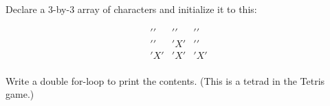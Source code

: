 \begin{ex}
Declare a 3-by-3 array of characters and initialize it to this:

\begin{align*}
' ' & ' ' & ' ' \\
' ' & 'X' & ' ' \\
'X' & 'X' & 'X' \\
\end{align*}

Write a double for-loop to print the contents. (This is a tetrad in the Tetris game.)
\end{ex}
